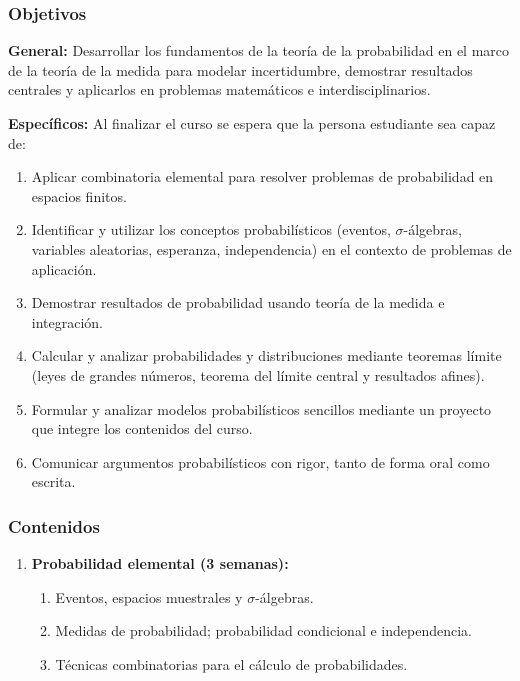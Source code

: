 \begin{refsection}
\subsubsection*{Objetivos}

\textbf{General:} Desarrollar los fundamentos de la teoría de la probabilidad en el marco de la teoría de la medida para modelar incertidumbre, demostrar resultados centrales y aplicarlos en problemas matemáticos e interdisciplinarios.

\textbf{Específicos:} Al finalizar el curso se espera que la persona estudiante sea capaz de:

\begin{enumerate}
\item Aplicar combinatoria elemental para resolver problemas de probabilidad en espacios finitos.
\item Identificar y utilizar los conceptos probabilísticos (eventos, $\sigma$-álgebras, variables aleatorias, esperanza, independencia) en el contexto de problemas de aplicación.
\item Demostrar resultados de probabilidad usando teoría de la medida e integración.
\item Calcular y analizar probabilidades y distribuciones mediante teoremas límite (leyes de grandes números, teorema del límite central y resultados afines).
\item Formular y analizar modelos probabilísticos sencillos mediante un proyecto que integre los contenidos del curso.
\item Comunicar argumentos probabilísticos con rigor, tanto de forma oral como escrita.
\end{enumerate}

\subsubsection*{Contenidos}

\begin{enumerate}

\item \textbf{Probabilidad elemental (3 semanas):}
\begin{enumerate}
    \item Eventos, espacios muestrales y $\sigma$-álgebras.
    \item Medidas de probabilidad; probabilidad condicional e independencia.
    \item Técnicas combinatorias para el cálculo de probabilidades.
\end{enumerate}


\end{enumerate}
\end{refsection}
